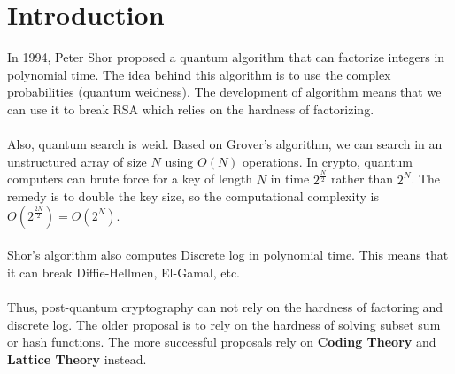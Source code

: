 \documentclass{scribe}
\begin{document}
\maketitle

\section{Introduction}
In 1994, Peter Shor proposed a quantum algorithm that can factorize integers in polynomial time.
The idea behind this algorithm is to use the complex probabilities (quantum weidness).
The development of algorithm means that we can use it to break RSA which relies on the hardness of factorizing.
\\\\
Also, quantum search is weid. Based on Grover's algorithm, we can search in an unstructured array of size $N$ using $O(N)$ operations.
In crypto, quantum computers can brute force for a key of length $N$ in time $2^{\frac{N}{2}}$ rather than $2^N$. The remedy is to double the key size, so the computational complexity is $O(2^{\frac{2N}{2}}) =O(2^N)$.
\\\\
Shor's algorithm also computes Discrete log in polynomial time. This means that it can break Diffie-Hellmen, El-Gamal, etc.
\\\\
Thus, post-quantum cryptography can not rely on the hardness of factoring and discrete log. The older proposal is to rely on the hardness of solving subset sum or hash functions. The more successful proposals rely on \textbf{Coding Theory} and \textbf{Lattice Theory} instead.
\vspace{10mm}
\end{document}
